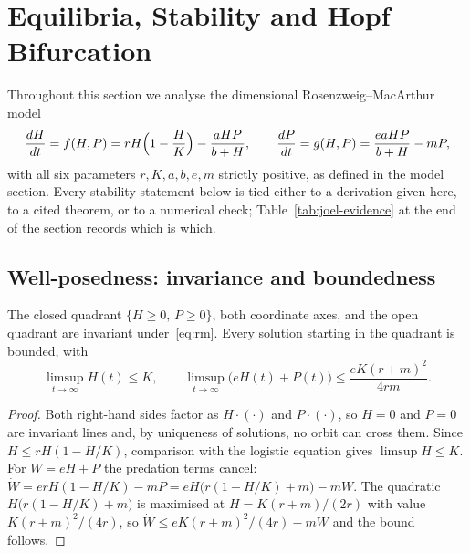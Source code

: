 
\section{Equilibria, Stability and Hopf Bifurcation}\label{sec:joel}

Throughout this section we analyse the dimensional Rosenzweig--MacArthur model
\begin{equation}\label{eq:rm}
\frac{dH}{dt}= f(H,P) = rH\Bigl(1-\frac{H}{K}\Bigr)-\frac{aHP}{b+H},
\qquad
\frac{dP}{dt}= g(H,P) = \frac{eaHP}{b+H}-mP,
\end{equation}
with all six parameters $r,K,a,b,e,m$ strictly positive, as defined in the model section.
Every stability statement below is tied either to a derivation given here, to a
cited theorem, or to a numerical check; Table~\ref{tab:joel-evidence} at the end of the
section records which is which.

\subsection{Well-posedness: invariance and boundedness}

\begin{lemma}\label{lem:bounded}
The closed quadrant $\{H\ge 0,\,P\ge 0\}$, both coordinate axes, and the open quadrant are
invariant under~\eqref{eq:rm}. Every solution starting in the quadrant is bounded, with
\[
\limsup_{t\to\infty} H(t)\le K,
\qquad
\limsup_{t\to\infty}\bigl(eH(t)+P(t)\bigr)\le \frac{eK(r+m)^2}{4rm}.
\]
\end{lemma}

\begin{proof}
Both right-hand sides factor as $H\cdot(\cdot)$ and $P\cdot(\cdot)$, so $H=0$ and $P=0$ are
invariant lines and, by uniqueness of solutions, no orbit can cross them. Since
$\dot H\le rH(1-H/K)$, comparison with the logistic equation gives $\limsup H\le K$.
For $W=eH+P$ the predation terms cancel:
$\dot W = erH(1-H/K)-mP = eH\bigl(r(1-H/K)+m\bigr)-mW$.
The quadratic $H\bigl(r(1-H/K)+m\bigr)$ is maximised at $H=K(r+m)/(2r)$ with value
$K(r+m)^2/(4r)$, so $\dot W\le eK(r+m)^2/(4r)-mW$ and the bound follows.
\end{proof}

